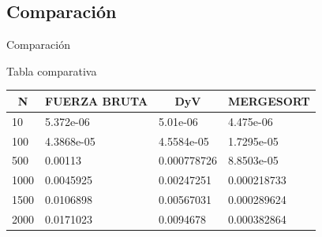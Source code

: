 \subsection{Comparación}
\begin{frame}{Comparación}
\begin{exampleblock}{Tabla comparativa}
\begin{table}
\begin{tabular}{|l|l|l|l|}
\multicolumn{1}{c}{\textbf{N}} & \multicolumn{1}{c}{\textbf{FUERZA BRUTA}} & \multicolumn{1}{c}{\textbf{DyV}} & \multicolumn{1}{c}{\textbf{MERGESORT}} \\
\hline
10                                                     & 5.372e-06                                                         & 5.01e-06                                                 & 4.475e-06                                                          \\
\hline
100                                                    & 4.3868e-05                                                        & 4.5584e-05                                               & 1.7295e-05                                                         \\
\hline
500                                                    & 0.00113                                                           & 0.000778726                                              & 8.8503e-05                                                         \\
\hline
1000                                                   & 0.0045925                                                         & 0.00247251                                               & 0.000218733                                                        \\
\hline
1500                                                   & 0.0106898                                                         & 0.00567031                                               & 0.000289624                                                        \\
\hline
2000                                                   & 0.0171023                                                         & 0.0094678                                                & 0.000382864                                                        \\
\hline
\end{tabular}
\end{table}
\end{exampleblock}
\end{frame}

